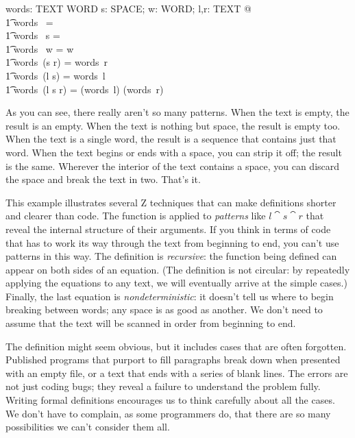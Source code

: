 \documentclass{article}
\begin{document}
\begin{axdef}
        words: TEXT \fun \seq WORD
\where 
        \forall s: SPACE; w: WORD; l,r: TEXT  @ \\
\t1		words~ \langle \rangle = \langle \rangle \land \\
\t1		words~ s = \langle \rangle \land \\
\t1		words~ w = \langle w \rangle \land \\
\t1		words~(s \cat r) = words~r \land \\
\t1		words~(l \cat s) = words~l \land \\
\t1		words~(l \cat s \cat r) = (words~l) \cat (words~r)
\end{axdef}
As you can see, there really aren't so many patterns. When the text is empty,
the result is an empty.  When the text is nothing but space, the
result is empty too.  When the text is a single word, the result is a
sequence that contains just that word.  When the text begins or ends with a
space, you can strip it off; the result is the same.  Wherever
the interior of the text contains a space, you can discard the space and 
break the text in two.   That's it.

This example illustrates several Z techniques that can make definitions
shorter and clearer than code.  The function is applied to {\em patterns}
like $l \cat s \cat r$ that reveal the internal structure of their arguments.
If you think in terms of code that has to work its way through the text from
beginning to end, you can't use patterns in this way.  The definition is
{\em recursive}: the function being defined can appear on both sides of an
equation.  (The definition is not circular: by repeatedly applying the
equations to any text, we will eventually arrive at the simple cases.)
Finally, the last equation is {\em nondeterministic}: it doesn't tell us
where to begin breaking between words; any space is as good as another.  We
don't need to assume that the text will be scanned in order from beginning
to end.

The definition might seem obvious, but it includes cases that are often
forgotten.  Published programs that purport to fill paragraphs break down
when presented with an empty file, or a text that ends with a series of
blank lines.  The errors are not just coding bugs; they reveal a failure to
understand the problem fully.  Writing formal definitions encourages us to 
think carefully about all the cases.  We don't have to complain, as some
programmers do, that there are so many possibilities we can't consider
them all.
\end{document}
